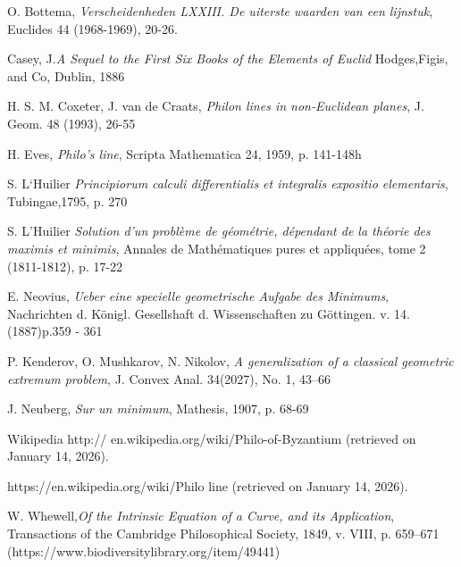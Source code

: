 \documentclass[a4paper,12pt]{amsart}
\begin{document}



\begin{thebibliography}{}

 O. Bottema, {\it Verscheidenheden LXXIII. De uiterste waarden van een lijnstuk},
Euclides 44 (1968-1969), 20-26.


 Casey, J.{\it A Sequel to the First Six Books of the Elements of Euclid} Hodges,Figis, and Co, Dublin, 1886

 H. S. M. Coxeter, J. van de Craats, {\it Philon lines in non-Euclidean planes},
J. Geom. 48 (1993), 26-55

 H. Eves, {\it Philo's line}, Scripta Mathematica 24, 1959, p. 141-148h

 S. L`Huilier {\it Principiorum calculi differentialis et integralis expositio elementaris}, Tubingae,1795, p. 270

S. L'Huilier {\it  Solution d’un problème de géométrie, dépendant
de la théorie des maximis et minimis},
Annales de Mathématiques pures et appliquées, tome 2 (1811-1812), p. 17-22

 E. Neovius, {\it  Ueber eine specielle geometrische Aufgabe des
Minimums}, Nachrichten d. Königl. Gesellshaft d. Wissenschaften
zu Göttingen. v. 14. (1887)p.359 - 361


 P. Kenderov, O. Mushkarov, N. Nikolov, {\it A generalization of a classical
geometric extremum problem}, J. Convex Anal. 34(2027), No. 1, 43–66

 J. Neuberg, {\it Sur un minimum}, Mathesis, 1907, p. 68-69


 {Wikipedia http:// en.wikipedia.org/wiki/Philo-of-Byzantium}
 (retrieved on January 14, 2026).

  {https://en.wikipedia.org/wiki/Philo line} (retrieved on January 14, 2026).

 W. Whewell,{\it Of the Intrinsic Equation of a Curve, and its Application}, Transactions of the Cambridge Philosophical Society, 1849, v. VIII, p. 659–671
(https://www.biodiversitylibrary.org/item/49441)


\end{thebibliography}
\end{document}
